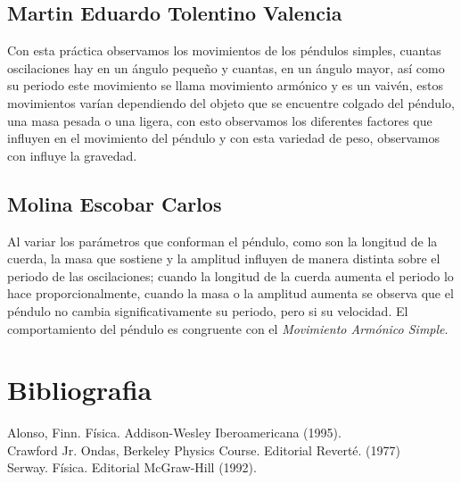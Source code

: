 \documentclass[11pt]{article}
\begin{document}
\begin{multicols}{2}
	\subsection{Martin Eduardo Tolentino Valencia}
	Con esta práctica observamos los movimientos de los péndulos simples, cuantas oscilaciones hay en un ángulo pequeño y cuantas, en un ángulo mayor, así como su periodo este movimiento se llama movimiento armónico y es un vaivén, estos movimientos varían dependiendo del objeto que se encuentre colgado del péndulo, una masa pesada o una ligera, con esto observamos los diferentes factores que influyen en el movimiento del péndulo y con esta variedad de peso, observamos con influye la gravedad.

	\subsection{Molina Escobar Carlos}
	Al variar los parámetros que conforman el péndulo, como son la longitud de la cuerda, la masa que sostiene y la amplitud influyen de manera distinta sobre el periodo de las oscilaciones; cuando la longitud de la cuerda aumenta el periodo lo hace proporcionalmente, cuando la masa o la amplitud aumenta se observa que el péndulo no cambia significativamente su periodo, pero si su velocidad. El comportamiento del péndulo es congruente con el  \textit{Movimiento Armónico Simple}.

	
\section{Bibliografia}
Alonso, Finn. Física. Addison-Wesley Iberoamericana (1995).\\
Crawford Jr. Ondas, Berkeley Physics Course. Editorial Reverté. (1977)\\
Serway. Física. Editorial McGraw-Hill (1992).\\


\end{multicols}
\end{document}
